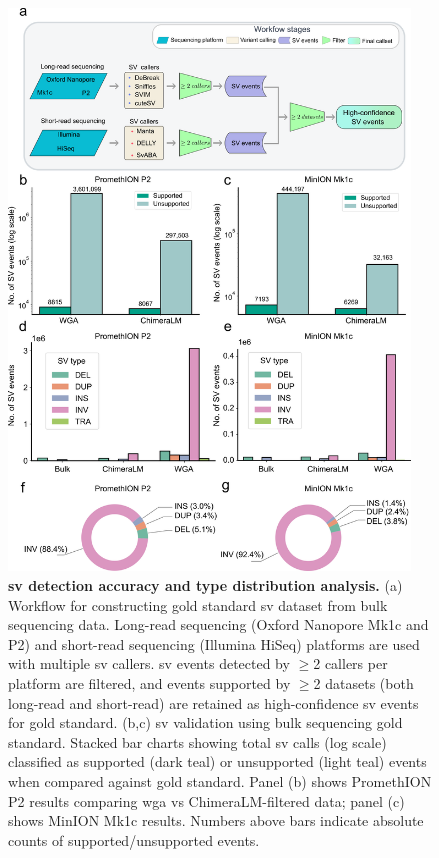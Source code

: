 \documentclass[pdflatex,sn-nature]{sn-jnl}%
\theoremstyle{thmstyleone}%
\theoremstyle{thmstyletwo}%
\theoremstyle{thmstylethree}%
\begin{document}
\begin{figure}[!ht]
	\begin{center}
		\includegraphics[width=0.95\textwidth]{final_figures/figure3}
	\end{center}
	\caption{{\bf \gls{sv} detection accuracy and type distribution analysis.}
		(a) Workflow for constructing gold standard \gls{sv} dataset from bulk sequencing data. Long-read sequencing (Oxford Nanopore Mk1c and P2) and short-read sequencing (Illumina HiSeq) platforms are used with multiple \gls{sv} callers. \gls{sv} events detected by $\geq$2 callers per platform are filtered, and events supported by $\geq$2 datasets (both long-read and short-read) are retained as high-confidence \gls{sv} events for gold standard.
		(b,c) \gls{sv} validation using bulk sequencing gold standard. Stacked bar charts showing total \gls{sv} calls (log scale) classified as supported (dark teal) or unsupported (light teal) events when compared against gold standard. Panel (b) shows PromethION P2 results comparing \gls{wga} vs ChimeraLM-filtered data; panel (c) shows MinION Mk1c results. Numbers above bars indicate absolute counts of supported/unsupported events.
}
\end{figure}
\end{document}
